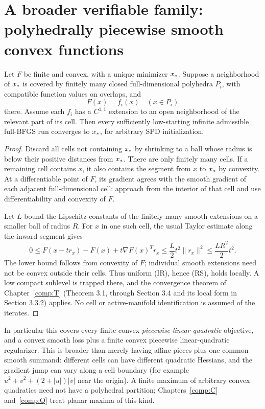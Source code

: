 \section{A broader verifiable family: polyhedrally piecewise smooth convex functions}
\begin{theorem}\label{R:thm:plq}
Let $F$ be finite and convex, with a unique minimizer $x_*$. Suppose a neighborhood of $x_*$ is covered by finitely many closed full-dimensional polyhedra $P_i$, with compatible function values on overlaps, and
\[
 F(x)=f_i(x)\quad(x\in P_i)
\]
there. Assume each $f_i$ has a $C^{1,1}$ extension to an open neighborhood of the relevant part of its cell. Then every sufficiently low-starting infinite admissible full-BFGS run converges to $x_*$, for arbitrary SPD initialization.
\end{theorem}
\begin{proof}
Discard all cells not containing $x_*$ by shrinking to a ball whose radius is below their positive distances from $x_*$. There are only finitely many cells. If a remaining cell contains $x$, it also contains the segment from $x$ to $x_*$ by convexity. At a differentiable point of $F$, its gradient agrees with the smooth gradient of each adjacent full-dimensional cell: approach from the interior of that cell and use differentiability and convexity of $F$.

Let $L$ bound the Lipschitz constants of the finitely many smooth extensions on a smaller ball of radius $R$. For $x$ in one such cell, the usual Taylor estimate along the inward segment gives
\[
 0\le F(x-t r_x)-F(x)+t\nabla F(x)^Tr_x
 \le\frac L2 t^2\|r_x\|^2\le\frac{LR^2}{2}t^2.
\]
The lower bound follows from convexity of $F$; individual smooth extensions need not be convex outside their cells. Thus uniform (IR), hence (RS), holds locally. A low compact sublevel is trapped there, and the convergence theorem of Chapter~\ref{comp:T} (Theorem 3.1, through Section 3.4 and its local form in Section 3.3.2) applies. No cell or active-manifold identification is assumed of the iterates.
\end{proof}
In particular this covers every finite convex \emph{piecewise linear-quadratic} objective, and a convex smooth loss plus a finite convex piecewise linear-quadratic regularizer. This is broader than merely having affine pieces plus one common smooth summand: different cells can have different quadratic Hessians, and the gradient jump can vary along a cell boundary (for example $u^2+v^2+(2+|u|)|v|$ near the origin). A finite maximum of arbitrary convex quadratics need not have a polyhedral partition; Chapters~\ref{comp:C} and~\ref{comp:Q} treat planar maxima of this kind.


